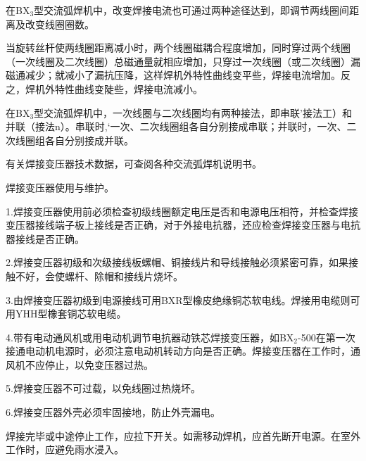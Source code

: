 \documentclass{ctexbook}
\begin{document}
在BX$_3$型交流弧焊机中，改变焊接电流也可通过两种途径达到，即调节两线圈间距离及改变线圈圈数。

当旋转丝杆使两线圈距离减小时，两个线圈磁耦合程度增加，同时穿过两个线圈（一次线圈及二次线圈）总磁通量就相应增加，只穿过一次线圈（或二次线圈）漏磁通减少；就减小了漏抗压降，这样焊机外特性曲线变平些，焊接电流增加。反之，焊机外特性曲线变陡些，焊接电流减小。

在BX$_3$型交流弧焊机中，一次线圈与二次线圈均有两种接法，即串联'接法工）和并联（接法n）。串联时,‘一次、二次线圈组各自分别接成串联；并联时，一次、二次线圈组各自分别接成并联。

有关焊接变压器技术数据，可查阅各种交流弧焊机说明书。

焊接变压器使用与维护。

1.焊接变压器使用前必须检查初级线圈额定电压是否和电源电压相符，并检查焊接变压器接线端子板上接线是否正确，对于外接电抗器，还应检查焊接变压器与电抗器接线是否正确。

2.焊接变压器初级和次级接线板螺帽、铜接线片和导线接触必须紧密可靠，如果接触不好，会使螺杆、除帽和接线片烧坏。

3.由焊接变压器初级到电源接线可用BXR型橡皮绝缘铜芯软电线。焊接用电缆则可用YHH型橡套铜芯软电缆。

4.带有电动通风机或用电动机调节电抗器动铁芯焊接变压器，如BX$_2$-500在第一次接通电动机电源时，必须注意电动机转动方向是否正确。焊接变压器在工作时，通风机不应停止，以免变压器过热。

5.焊接变压器不可过载，以免线圈过热烧坏。

6.焊接变压器外壳必须牢固接地，防止外壳漏电。

焊接完毕或中途停止工作，应拉下开关。如需移动焊机，应首先断开电源。在室外工作时，应避免雨水浸入。
\end{document}
